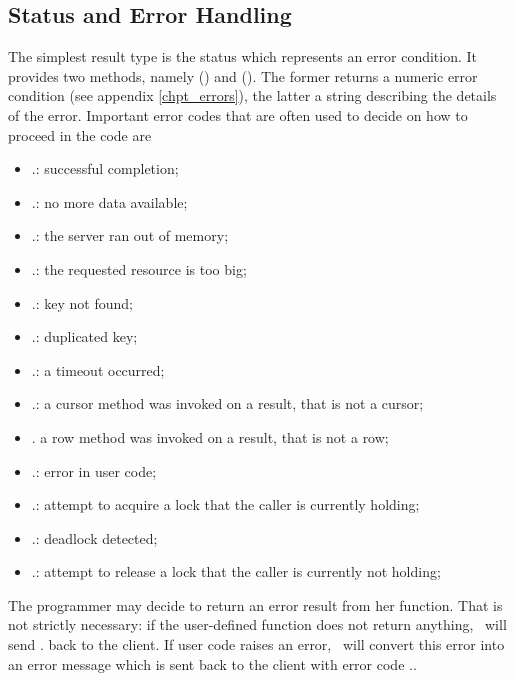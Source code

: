 \clearpage
\subsection{Status and Error Handling}
The simplest result type is
the status which represents an error condition.
It provides two methods, namely
() and ().
The former returns a numeric error condition (see appendix
\ref{chpt_errors}), the latter a string
describing the details of the error.
Important error codes that are often used to
decide on how to proceed in the code are

\begin{itemize}
\item {}.: successful completion;
\item {}.: no more data available;
\item {}.: the server ran out of memory;
\item {}.: the requested resource is too big;
\item {}.: key not found;
\item {}.: duplicated key;
\item {}.: a timeout occurred;
\item {}.: a cursor method was invoked on a result,
                            that is not a cursor;
\item {}. a row method was invoked on a result,
                            that is not a row;
\item {}.: error in user code;
\item {}.: attempt to acquire a lock that the caller
                             is currently holding;
\item {}.: deadlock detected;
\item {}.: attempt to release a lock that the caller
                              is currently not holding;
\end{itemize}

The programmer may decide to return an error result from
her function. That is not strictly necessary:
if the user-defined function does not return anything,
\nowdb\ will send . back to the client.
If user code raises an error, \nowdb\ will convert
this error into an error message which is sent back
to the client with error code ..

